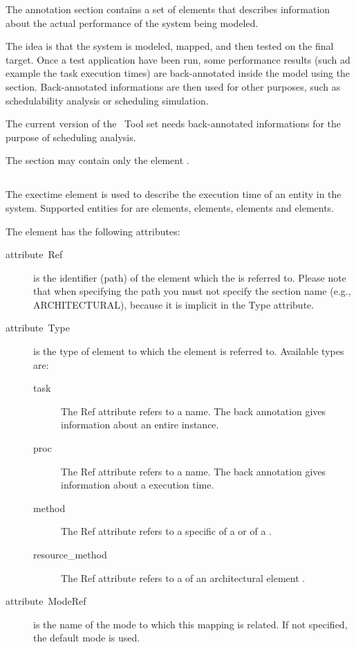 The annotation section contains a set of elements that describes
information about the actual performance of the system being modeled.

The idea is that the system is modeled, mapped, and then tested on the
final target. Once a test application have been run, some performance
results (such ad example the task execution times) are back-annotated
inside the model using the  section. Back-annotated
informations are then used for other purposes, such as schedulability
analysis or scheduling simulation.

The current version of the \rtd\ Tool set needs back-annotated
informations for the purpose of scheduling analysis.

The  section may contain only the element
.


\subsection{}

The exectime element is used to describe the execution time of an
entity in the system. Supported entities for  are
 elements,  elements,  elements
and   elements.

The  element has the following attributes:
\begin{description}
\item [{attribute~Ref}] is the identifier (path) of the element which
  the  is referred to. Please note that when
  specifying the path you must not specify the section name (e.g.,
  ARCHITECTURAL), because it is implicit in the Type attribute.
\item [{attribute~Type}] is the type of element to which the
   element is referred to. Available types are:

  \begin{description}
  \item [{task}] The Ref attribute refers to a  name. The
    back annotation gives information about an entire 
    instance.
  \item [{proc}] The Ref attribute refers to a  name. The
    back annotation gives information about a  execution
    time.
  \item [{method}] The Ref attribute refers to a specific
     of a  or of a .
  \item [{resource\_method}] The Ref attribute refers to a
     of an architectural element .
  \end{description}
  
\item [{attribute~ModeRef}] is the name of the mode to which this
  mapping is related. If not specified, the default mode is used.
\end{description}

